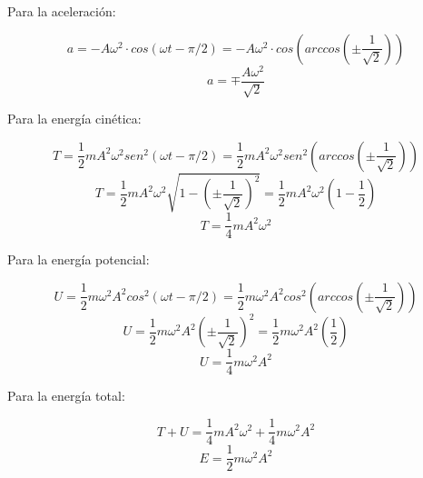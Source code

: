\documentclass[letter,11pt]{article}
\begin{document}
Para la aceleración:

\begin{equation*}
    a = -A \omega^2 \cdot cos(\omega t - \pi / 2) = -A \omega^2 \cdot cos\left(arccos\left(\pm \frac{1}{\sqrt{2}}\right)\right)
\end{equation*}
\begin{equation}
    a = \mp \frac{A \omega^2}{\sqrt{2}}
\end{equation}

Para la energía cinética:

\begin{equation*}
    T = \frac{1}{2} m A^2 \omega^2 sen^2(\omega t - \pi/2) = \frac{1}{2} m A^2 \omega^2 sen^2\left(arccos\left(\pm \frac{1}{\sqrt{2}}\right)\right)
\end{equation*}
\begin{equation*}
    T = \frac{1}{2} m A^2 \omega^2 \sqrt{1 - \left(\pm \frac{1}{\sqrt{2}}\right)^2} = \frac{1}{2} m A^2 \omega^2 \left(1 - \frac{1}{2}\right)
\end{equation*}
\begin{equation}
    T = \frac{1}{4} m A^2 \omega^2
\end{equation}

Para la energía potencial:

\begin{equation*}
    U = \frac{1}{2} m \omega^2 A^2 cos^2(\omega t - \pi / 2) = \frac{1}{2} m \omega^2 A^2 cos^2\left(arccos\left(\pm \frac{1}{\sqrt{2}}\right)\right)
\end{equation*}
\begin{equation*}
    U = \frac{1}{2} m \omega^2 A^2 \left(\pm \frac{1}{\sqrt{2}}\right)^2 = \frac{1}{2} m \omega^2 A^2 \left(\frac{1}{2}\right)
\end{equation*}
\begin{equation}
    U = \frac{1}{4} m \omega^2 A^2
\end{equation}

Para la energía total:

\begin{equation*}
    T + U = \frac{1}{4} m A^2 \omega^2 + \frac{1}{4} m \omega^2 A^2
\end{equation*}
\begin{equation}
    E = \frac{1}{2} m \omega^2 A^2
\end{equation}
\end{document}
